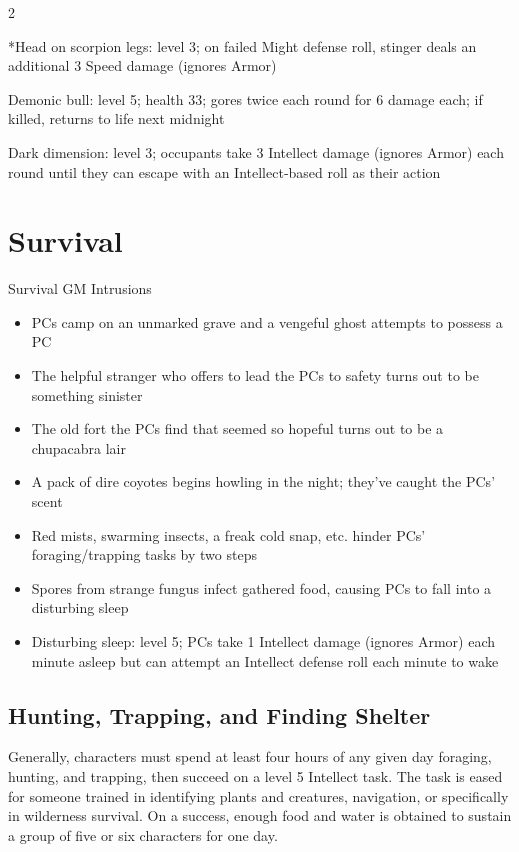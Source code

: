 \begin{multicols}{2}

*Head on scorpion legs: level 3; on failed Might defense roll, stinger deals an additional 3 Speed damage (ignores Armor)

Demonic bull: level 5; health 33; gores twice each round for 6 damage each; if killed, returns to life next midnight

Dark dimension: level 3; occupants take 3 Intellect damage (ignores Armor) each round until they can escape with an Intellect‑based roll as their action

\chapter{Survival}

Survival GM Intrusions

\begin{itemize}
\item PCs camp on an unmarked grave and a vengeful ghost attempts to possess a PC 
\item The helpful stranger who offers to lead the PCs to safety turns out to be something sinister 
\item The old fort the PCs find that seemed so hopeful turns out to be a chupacabra lair 
\item A pack of dire coyotes begins howling in the night; they’ve caught the PCs’ scent 
\item Red mists, swarming insects, a freak cold snap, etc. hinder PCs’ foraging/trapping tasks by two steps 
\item Spores from strange fungus infect gathered food, causing PCs to fall into a disturbing sleep
\item Disturbing sleep: level 5; PCs take 1 Intellect damage (ignores Armor) each minute asleep but can attempt an Intellect defense roll each minute to wake 
\end{itemize}

\section{Hunting, Trapping, and Finding Shelter}

Generally, characters must spend at least four hours of any given day foraging, hunting, and trapping, then succeed on a level 5 Intellect task. The task is eased for someone trained in identifying plants and creatures, navigation, or specifically in wilderness survival. On a success, enough food and water is obtained to sustain a group of five or six characters for one day. 


\end{multicols}
